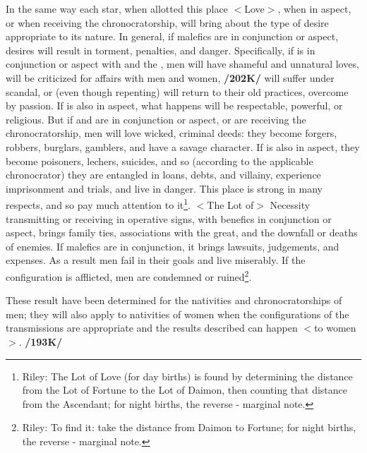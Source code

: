 In the same way each star, when allotted this place $<$Love$>$, when in aspect, or when receiving the chronocratorship, will bring about the type of desire appropriate to its nature. In general, if malefics are in conjunction or aspect, desires will result in torment, penalties, and danger. Specifically, if \Saturn\xspace is in conjunction or aspect with \Venus\xspace and the \Moon, men will have shameful and unnatural loves, will be criticized for affairs with men and women, \textbf{/202K/} will suffer under scandal, or (even though repenting) will return to their old practices, overcome by passion. If \Jupiter\xspace is also in aspect, what happens will be respectable, powerful, or religious. But if \Mars\xspace and \Mercury\xspace are in conjunction or aspect, or are receiving the chronocratorship, men will love wicked, criminal deeds: they become forgers, robbers, burglars, gamblers, and have a savage character. If \Venus\xspace is also in aspect, they become poisoners, lechers, suicides, and so (according to the applicable chronocrator) they are entangled in loans, debts, and villainy, experience imprisonment and trials, and live in danger. This place is strong in many respects, and so pay much
attention to it\footnote{Riley: The Lot of Love (for day births) is found by determining the distance from the Lot of Fortune to the Lot of Daimon, then counting that distance from the Ascendant; for night births, the reverse - marginal note.}.
\enlargethispage{\baselineskip}
$<$The Lot of$>$ Necessity  transmitting or receiving in operative signs, with benefics in conjunction or
aspect, brings family ties, associations with the great, and the downfall or deaths of enemies. If malefics are in conjunction, it brings lawsuits, judgements, and expenses. As a result men fail in their goals and live miserably. If the configuration is afflicted, men are condemned or ruined\footnote{Riley: To find it: take the distance from Daimon to Fortune; for night births, the reverse - marginal note.}.

These result have been determined for the nativities and chronocratorships of men; they will also apply to nativities of women when the configurations of the transmissions are appropriate and the results described can happen $<$to women$>$. \textbf{/193K/}

\newpage